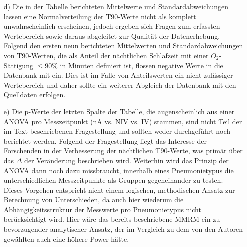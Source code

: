 \documentclass{scrartcl}
\theoremstyle{definition}
\theoremstyle{remark}
\begin{document}
\begin{enumerate}
	\item[d) ]Die in der Tabelle berichteten Mittelwerte und Standardabweichungen lassen eine Normalverteilung der T90-Werte nicht als komplett unwahrscheinlich erscheinen, jedoch ergeben sich Fragen zum erfassten Wertebereich sowie daraus abgeleitet zur Qualität der Datenerhebung. Folgend den ersten neun berichteten Mittelwerten und Standardabweichungen von T90-Werten, die als Anteil der nächtlichen Schlafzeit mit einer $O_2$-Sättigung $\le 90\%$ in Minuten definiert ist, flossen negative Werte in die Datenbank mit ein. Dies ist im Falle von Anteilswerten ein nicht zulässiger Wertebereich und daher sollte ein weiterer Abgleich der Datenbank mit den Quelldaten erfolgen. 
	\item [e) ]Die p-Werte der letzten Spalte der Tabelle, die augenscheinlich aus einer ANOVA pro Messzeitpunkt (nA vs. NIV vs. IV) stammen, sind nicht Teil der im Text beschriebenen Fragestellung und sollten weder durchgeführt noch berichtet werden. Folgend der Fragestellung liegt das Interesse der Forschenden in der Verbesserung der nächtlichen T90-Werte, was primär über das $\Delta$ der Veränderung beschrieben wird. Weiterhin wird das Prinzip der ANOVA dann noch dazu missbraucht, innerhalb eines Pneumonietypus die unterschiedlichen Messzeitpunkte als Gruppen gegeneinander zu testen. Dieses Vorgehen entspricht nicht einem logischen, methodischen Ansatz zur Berechnung von Unterschieden, da auch hier wiederum die Abhängigkeitsstruktur der Messwerte pro Pneumonietypus nicht berücksichtigt wird. Hier wäre das bereits beschriebene MMRM ein zu bevorzugender analytischer Ansatz, der im Vergleich zu dem von den Autoren gewählten auch eine höhere Power hätte.   
\end{enumerate}
\end{document}
